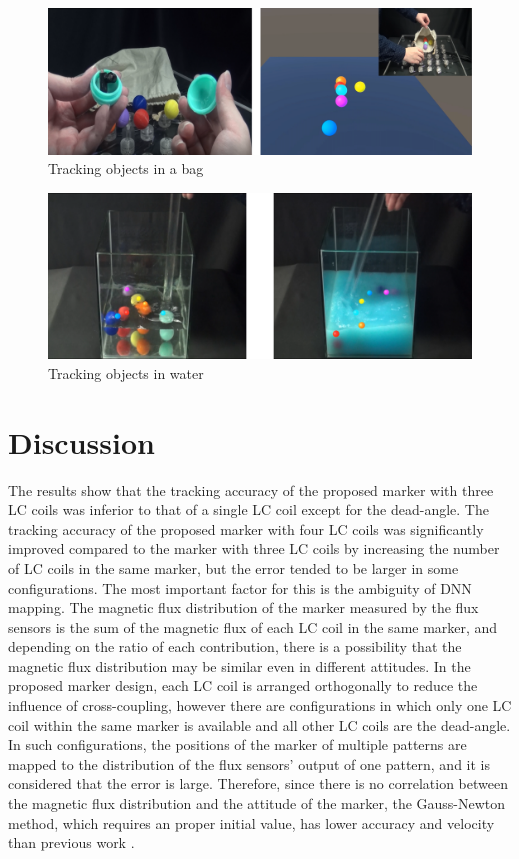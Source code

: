 \documentclass[journal,twoside,web]{ieeecolor}
\begin{document}
\begin{figure}[t]
    \centerline{\includegraphics[width=\columnwidth]{figure/capsule_cloth.png}}
    \caption{Tracking objects in a bag}
    \label{capsule_cloth}
\end{figure}
\begin{figure}[t]
    \centerline{\includegraphics[width=\columnwidth]{figure/capsule_water.png}}
    \caption{Tracking objects in water}
    \label{capsule_water}
\end{figure}

\section{Discussion}
\label{discussion}
The results show that the tracking accuracy of the proposed marker with three LC coils was inferior to that of a single LC coil except for the dead-angle. The tracking accuracy of the proposed marker with four LC coils was significantly improved compared to the marker with three LC coils by increasing the number of LC coils in the same marker, but the error tended to be larger in some configurations. The most important factor for this is the ambiguity of DNN mapping. The magnetic flux distribution of the marker measured by the flux sensors is the sum of the magnetic flux of each LC coil in the same marker, and depending on the ratio of each contribution, there is a possibility that the magnetic flux distribution may be similar even in different attitudes. In the proposed marker design, each LC coil is arranged orthogonally to reduce the influence of cross-coupling, however there are configurations in which only one LC coil within the same marker is available and all other LC coils are the dead-angle. In such configurations, the positions of the marker of multiple patterns are mapped to the distribution of the flux sensors' output of one pattern, and it is considered that the error is large. Therefore, since there is no correlation between the magnetic flux distribution and the attitude of the marker, the Gauss-Newton method, which requires an proper initial value, has lower accuracy and velocity than previous work \cite{im3d, im6d, yabukami1, hashi1}.
\end{document}
